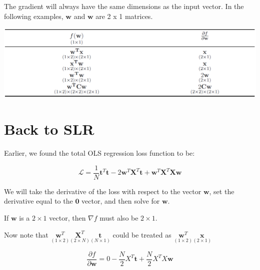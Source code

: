 \documentclass[
]{book}
\begin{document}
The gradient will always have the same dimensions as the input vector.
In the following examples, \(\mathbf{w}\) and \(\mathbf{w}\) are 2 x 1
matrices.

\includegraphics[width=18.24in]{images/derivatives}

\hypertarget{back-to-slr}{%
\section{Back to SLR}\label{back-to-slr}}

Earlier, we found the total OLS regression loss function to be:

\[\mathcal{L} = \frac{1}{N}\mathbf{t}^T\mathbf{t} - 2\mathbf{w}^T\mathbf{X}^T\mathbf{t} +
\mathbf{w}^T\mathbf{X}^T\mathbf{X}\mathbf{w}\]

We will take the derivative of the loss with respect to the vector \(\mathbf{w}\), set the derivative equal to
the \(\mathbf{0}\) vector, and then solve for \(\mathbf{w}\).

If \(\mathbf{w}\) is a \(2 \times 1\) vector, then \(\nabla{f}\) must also be \(2 \times 1\).

Now note that \(\underset{(1 \times 2)}{\mathbf{w}^T}\underset{(2 \times N)}{\mathbf{X}^T}\underset{(N \times 1)}{\mathbf{t}}\) could be treated as \(\underset{(1 \times 2)}{\mathbf{w}^T}\underset{(2 \times 1)}{\mathbf{x}}\)

\[
\frac{\partial f}{\partial\mathbf{w}} =
0 - 
\frac{N}{2}X^T\mathbf{t} +
\frac{N}{2}X^TX\mathbf{w}
\]

  
\end{document}
